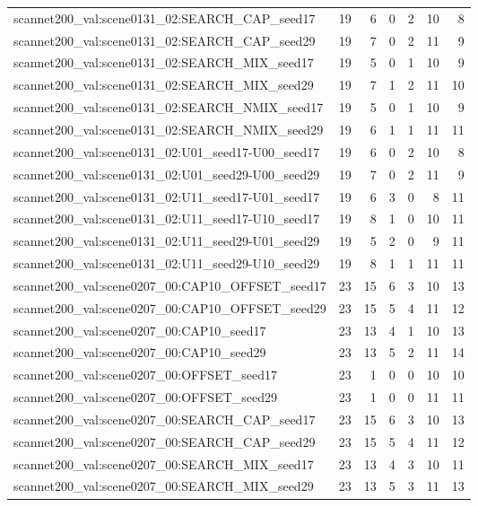\begin{table}[t]
\begin{tabular}{lrrrrrr}
scannet200\_val:scene0131\_02:SEARCH\_CAP\_seed17 & 19 & 6 & 0 & 2 & 10 & 8 \\
scannet200\_val:scene0131\_02:SEARCH\_CAP\_seed29 & 19 & 7 & 0 & 2 & 11 & 9 \\
scannet200\_val:scene0131\_02:SEARCH\_MIX\_seed17 & 19 & 5 & 0 & 1 & 10 & 9 \\
scannet200\_val:scene0131\_02:SEARCH\_MIX\_seed29 & 19 & 7 & 1 & 2 & 11 & 10 \\
scannet200\_val:scene0131\_02:SEARCH\_NMIX\_seed17 & 19 & 5 & 0 & 1 & 10 & 9 \\
scannet200\_val:scene0131\_02:SEARCH\_NMIX\_seed29 & 19 & 6 & 1 & 1 & 11 & 11 \\
scannet200\_val:scene0131\_02:U01\_seed17-U00\_seed17 & 19 & 6 & 0 & 2 & 10 & 8 \\
scannet200\_val:scene0131\_02:U01\_seed29-U00\_seed29 & 19 & 7 & 0 & 2 & 11 & 9 \\
scannet200\_val:scene0131\_02:U11\_seed17-U01\_seed17 & 19 & 6 & 3 & 0 & 8 & 11 \\
scannet200\_val:scene0131\_02:U11\_seed17-U10\_seed17 & 19 & 8 & 1 & 0 & 10 & 11 \\
scannet200\_val:scene0131\_02:U11\_seed29-U01\_seed29 & 19 & 5 & 2 & 0 & 9 & 11 \\
scannet200\_val:scene0131\_02:U11\_seed29-U10\_seed29 & 19 & 8 & 1 & 1 & 11 & 11 \\
scannet200\_val:scene0207\_00:CAP10\_OFFSET\_seed17 & 23 & 15 & 6 & 3 & 10 & 13 \\
scannet200\_val:scene0207\_00:CAP10\_OFFSET\_seed29 & 23 & 15 & 5 & 4 & 11 & 12 \\
scannet200\_val:scene0207\_00:CAP10\_seed17 & 23 & 13 & 4 & 1 & 10 & 13 \\
scannet200\_val:scene0207\_00:CAP10\_seed29 & 23 & 13 & 5 & 2 & 11 & 14 \\
scannet200\_val:scene0207\_00:OFFSET\_seed17 & 23 & 1 & 0 & 0 & 10 & 10 \\
scannet200\_val:scene0207\_00:OFFSET\_seed29 & 23 & 1 & 0 & 0 & 11 & 11 \\
scannet200\_val:scene0207\_00:SEARCH\_CAP\_seed17 & 23 & 15 & 6 & 3 & 10 & 13 \\
scannet200\_val:scene0207\_00:SEARCH\_CAP\_seed29 & 23 & 15 & 5 & 4 & 11 & 12 \\
scannet200\_val:scene0207\_00:SEARCH\_MIX\_seed17 & 23 & 13 & 4 & 3 & 10 & 11 \\
scannet200\_val:scene0207\_00:SEARCH\_MIX\_seed29 & 23 & 13 & 5 & 3 & 11 & 13 \\

\end{tabular}
\end{table}
